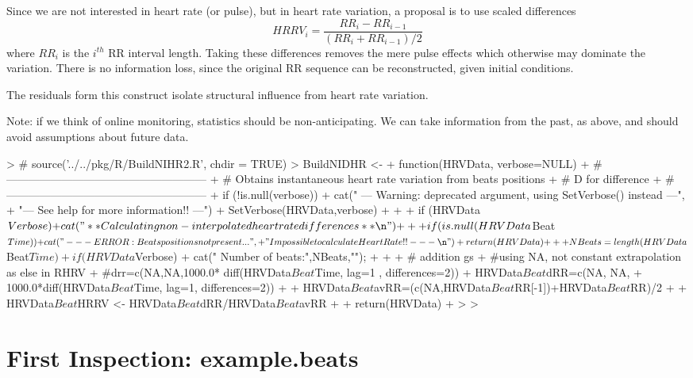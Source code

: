 \documentclass[a4paper, english, utf8]{amsart}
\begin{document}
Since we are not interested in heart rate (or pulse), but in heart rate variation, a proposal is to use scaled differences
$$
HRRV_i = \frac{RR_i - RR_{i-1}}{(RR_i + RR_{i-1})/2}
$$
where $RR_i$ is the $i^{th}$ RR interval length. Taking these differences removes the mere pulse effects which otherwise may dominate the variation. There is no information loss, since the original RR sequence can be reconstructed, given initial conditions.

The residuals form this construct isolate structural influence from heart rate variation.

Note: if we think of online monitoring, statistics should be non-anticipating. We can take information from the past, as above, and should avoid assumptions about future data.


\begin{Schunk}
\begin{Sinput}
> # source('../../pkg/R/BuildNIHR2.R', chdir = TRUE)
> BuildNIDHR <-
+ function(HRVData, verbose=NULL) {
+ #------------------------------------------------------ 
+ # Obtains instantaneous heart rate variation from beats positions
+ # D for difference
+ #------------------------------------------------------ 
+ if (!is.null(verbose)) {
+ 	cat("  --- Warning: deprecated argument, using SetVerbose() instead ---\n",
+ 	    "--- See help for more information!! ---\n")
+ 	SetVerbose(HRVData,verbose)
+ }
+ 
+ if (HRVData$Verbose) {
+ 	cat("** Calculating non-interpolated heart rate differences **\n")
+ }
+ 
+ if (is.null(HRVData$Beat$Time)) {
+ 	cat("   --- ERROR: Beats positions not present... ",
+ 	"Impossible to calculate Heart Rate!! ---\n")
+ 	return(HRVData)
+ }
+ 
+ NBeats=length(HRVData$Beat$Time)
+ if (HRVData$Verbose) {
+ 	cat("   Number of beats:",NBeats,"\n");
+ }
+ 
+   # addition gs 
+    #using NA, not constant extrapolation as else in RHRV  
+    #drr=c(NA,NA,1000.0*	diff(HRVData$Beat$Time, lag=1 , differences=2))
+    HRVData$Beat$dRR=c(NA, NA, 
+    	1000.0*diff(HRVData$Beat$Time, lag=1, differences=2))
+ 
+    HRVData$Beat$avRR=(c(NA,HRVData$Beat$RR[-1])+HRVData$Beat$RR)/2
+    
+    HRVData$Beat$HRRV <- HRVData$Beat$dRR/HRVData$Beat$avRR
+ 
+ 	return(HRVData)
+ }
> 
> 
\end{Sinput}
\end{Schunk}
\clearpage

\section{First Inspection: example.beats}
\end{document}
